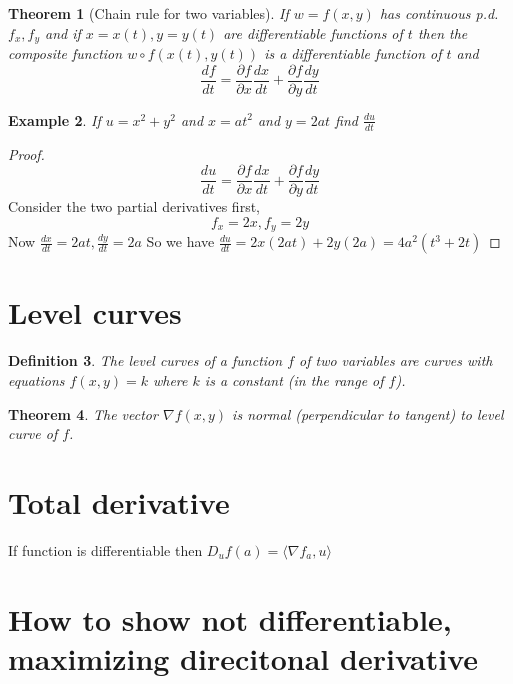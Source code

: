 \documentclass[oneside,11pt,pdftex]{book}%
\numberwithin{equation}{section}
\newtheorem{theorem}{Theorem}[chapter]%
\newtheorem{example}[theorem]{Example}
\newtheorem{definition}[theorem]{Definition}
\numberwithin{section}{chapter}
\numberwithin{equation}{chapter}
\begin{document}
\begin{theorem}[Chain rule for two variables]
	If $ w=f(x,y) $ has continuous p.d. $ f_x , f_y$ and if $ x=x(t), y=y(t) $ are differentiable functions of $ t $ then the composite function $ w \circ f(x(t), y(t)) $ is a differentiable function of $ t $ and 
	\[ \frac{d f}{dt}=\frac{\partial f}{\partial x}\frac{dx}{dt}+\frac{\partial f}{\partial y}\frac{dy}{dt} \]
\end{theorem}

\begin{example}
	If $ u=x^2+y^2 $ and $ x=at^2 $ and $ y=2at $ find $ \frac{du}{dt} $
\end{example}
\begin{proof}
	\[ \frac{du}{dt}=\frac{\partial f }{\partial x} \frac{dx}{dt}+ \frac{\partial f}{\partial y}\frac{dy}{dt}\]
	Consider the two partial derivatives first,
	\[ f_x=2x, f_y=2y \]
	Now $ \frac{dx}{dt} = 2at, \frac{dy}{dt}=2a$
	So we have $ \frac{du}{dt}=2x(2at)+2y(2a)=4a^2(t^3+2t) $
\end{proof}

\section{Level curves}
\begin{definition}
	The level curves of a function $ f $ of two variables are curves with equations $ f(x,y)=k $ where $ k $ is a constant (in the range of $ f $).
\end{definition}

\begin{theorem}
	The vector $ \nabla f(x,y) $ is normal (perpendicular to tangent) to level curve of $ f $.
\end{theorem}

\section{Total derivative}
If function is differentiable then $ D_u f(a)=\langle \nabla f_a, u \rangle $

\section{How to show not differentiable, maximizing direcitonal derivative}
\end{document}

